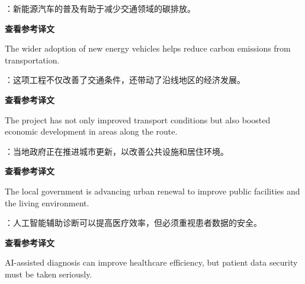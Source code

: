 \documentclass[a4paper,11pt,UTF8,fontset=none]{ctexart}
\begin{document}
\vspace{4pt}

：新能源汽车的普及有助于减少交通领域的碳排放。\par

\noindent\colorbox{HeadBlue}{\strut {\bfseries 查看参考译文}}\par\vspace{1pt}

\noindent The wider adoption of new energy vehicles helps reduce carbon emissions from transportation.\par

\vspace{4pt}

：这项工程不仅改善了交通条件，还带动了沿线地区的经济发展。\par

\noindent\colorbox{HeadBlue}{\strut {\bfseries 查看参考译文}}\par\vspace{1pt}

\noindent The project has not only improved transport conditions but also boosted economic development in areas along the route.\par

\vspace{4pt}

：当地政府正在推进城市更新，以改善公共设施和居住环境。\par

\noindent\colorbox{HeadBlue}{\strut {\bfseries 查看参考译文}}\par\vspace{1pt}

\noindent The local government is advancing urban renewal to improve public facilities and the living environment.\par

\vspace{4pt}

：人工智能辅助诊断可以提高医疗效率，但必须重视患者数据的安全。\par

\noindent\colorbox{HeadBlue}{\strut {\bfseries 查看参考译文}}\par\vspace{1pt}

\noindent AI-assisted diagnosis can improve healthcare efficiency, but patient data security must be taken seriously.\par
\end{document}
